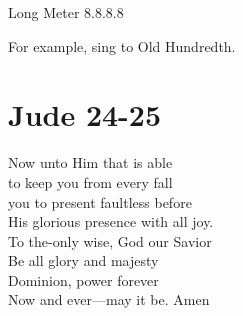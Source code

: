 \documentclass{article}
\begin{document}
\noindent Long Meter 8.8.8.8

\noindent For example, sing to Old Hundredth.

\section*{Jude 24-25}

 Now unto Him that is able\\
to keep you from every fall\\
you to present faultless before\\
His glorious presence with all joy.\\

 To the-only wise, God our Savior\\
Be all glory and majesty\\
Dominion, power forever\\
Now and ever---may it be. Amen\\
\end{document}
